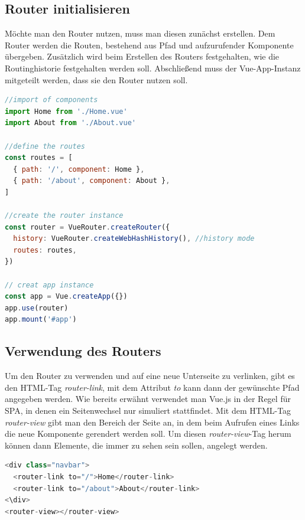 \subsection*{Router initialisieren}
Möchte man den Router nutzen, muss man diesen zunächst erstellen.
Dem Router werden die Routen, bestehend aus Pfad und aufzurufender Komponente übergeben.
Zusätzlich wird beim Erstellen des Routers festgehalten, wie die Routinghistorie festgehalten werden soll.
Abschließend muss der Vue-App-Instanz mitgeteilt werden, dass sie den Router nutzen soll. \cite{vueRouterGettingStarted}
\begin{lstlisting}[caption={Router initialisieren},language=javascript, label={lst:Router-initialisieren}]
//import of components
import Home from './Home.vue'
import About from './About.vue'

//define the routes
const routes = [
  { path: '/', component: Home },
  { path: '/about', component: About },
]

//create the router instance
const router = VueRouter.createRouter({
  history: VueRouter.createWebHashHistory(), //history mode
  routes: routes,
})

// creat app instance
const app = Vue.createApp({})
app.use(router)
app.mount('#app')
\end{lstlisting}

\subsection*{Verwendung des Routers}
Um den Router zu verwenden und auf eine neue Unterseite zu verlinken,
gibt es den HTML-Tag \emph{router-link}, mit dem Attribut \emph{to} kann dann der gewünschte Pfad angegeben werden.
Wie bereits erwähnt verwendet man Vue.js in der Regel für SPA, in denen ein Seitenwechsel nur simuliert stattfindet.
Mit dem HTML-Tag \emph{router-view} gibt man den Bereich der Seite an, in dem beim Aufrufen eines Links die neue Komponente gerendert werden soll.
Um diesen \emph{router-view}-Tag herum können dann Elemente, die immer zu sehen sein sollen, angelegt werden. \cite{vueRouterGettingStarted}

\begin{lstlisting}[caption={Verwendung des Routers},language=javascript,label={lst:Verwendung-des-Routers}]
<div class="navbar">
  <router-link to="/">Home</router-link>
  <router-link to="/about">About</router-link>
<\div>
<router-view></router-view>
\end{lstlisting}

